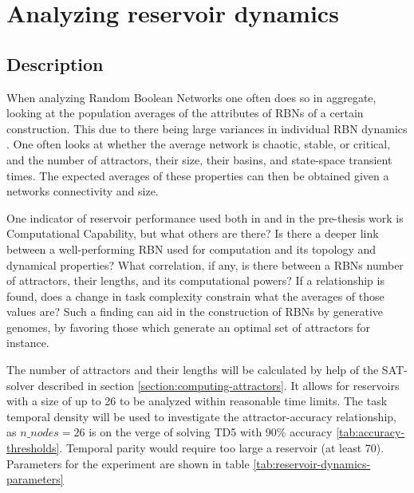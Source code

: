 \section{Analyzing reservoir dynamics}
\label{section:reservoir-dynamics}

\subsection{Description}

When analyzing Random Boolean Networks one often does so in aggregate,
looking at the population averages of the attributes of RBNs of a certain construction.
This due to there being large variances in individual RBN dynamics \cite{gershenson2004introduction}.
One often looks at whether the average network is chaotic, stable, or critical,
and the number of attractors, their size, their basins, and state-space transient times.
The expected averages of these properties can then be obtained given a networks connectivity and size.

One indicator of reservoir performance used both in \cite{rbn-reservoir} and in the pre-thesis work \cite{burkow2015evolving} is Computational Capability,
but what others are there?
Is there a deeper link between a well-performing RBN used for computation and its topology and dynamical properties?
What correlation, if any, is there between a RBNs number of attractors, their lengths, and its computational powers?
If a relationship is found, does a change in task complexity constrain what the averages of those values are?
Such a finding can aid in the construction of RBNs by generative genomes,
by favoring those which generate an optimal set of attractors for instance.

The number of attractors and their lengths will be calculated by help of the SAT-solver described in section \ref{section:computing-attractors}.
It allows for reservoirs with a size of up to 26 to be analyzed within reasonable time limits.
The task temporal density will be used to investigate the attractor-accuracy relationship,
as $ n\_nodes = 26 $ is on the verge of solving TD5 with 90\% accuracy \ref{tab:accuracy-thresholds}.
Temporal parity would require too large a reservoir (at least 70).
Parameters for the experiment are shown in table \ref{tab:reservoir-dynamics-parameters}

